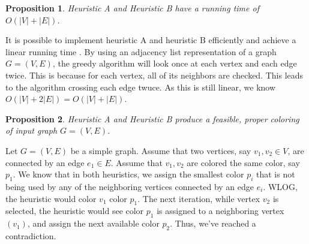 \documentclass{article}
\newtheorem{prop}{Proposition}
\theoremstyle{definition}
\begin{document}
\newpage

\begin{prop}
Heuristic A and Heuristic B have a running time of $O(|V| + |E|)$.
\end{prop}

It is possible to implement heuristic A and heuristic B efficiently and achieve a linear running time \cite{kubale}. By using an adjacency list representation of a graph \(G = (V, E)\), the greedy algorithm will look once at each vertex and each edge twice. This is because for each vertex, all of its neighbors are checked. This leads to the algorithm crossing each edge twuce. As this is still linear, we know \(O(|V| + 2|E|) = O(|V| + |E|)\).

\begin{prop}
Heuristic A and Heuristic B produce a feasible, proper coloring of input graph \(G = (V, E)\).
\end{prop}

Let \(G = (V, E)\) be a simple graph. Assume that two vertices, say \(v_1, v_2 \in V\), are connected by an edge \(e_1 \in E\). Assume that \(v_1, v_2\) are colored the same color, say \(p_1\). We know that in both heuristics, we assign the smallest color \(p_i\) that is not being used by any of the neighboring vertices connected by an edge \(e_i\). WLOG, the heuristic would color \(v_1\) color \(p_1\). The next iteration, while vertex \(v_2\) is selected, the heuristic would see color \(p_1\) is assigned to a neighboring vertex \((v_1)\), and assign the next available color \(p_2\). Thus, we've reached a contradiction.
\end{document}
